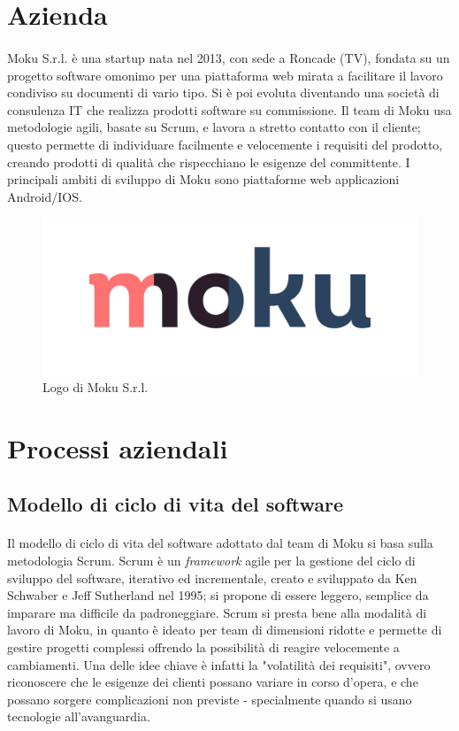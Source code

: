 \section{Azienda}
\paragraph{}
Moku S.r.l. è una startup nata nel 2013, con sede a Roncade (TV), fondata su un progetto software omonimo per una piattaforma web mirata a facilitare il lavoro condiviso su documenti di vario tipo. Si è poi evoluta diventando una società di consulenza IT che realizza prodotti software su commissione. 
Il team di Moku usa metodologie agili, basate su Scrum, e lavora a stretto contatto con il cliente; questo permette di individuare facilmente e velocemente i requisiti del prodotto, creando prodotti di qualità che rispecchiano le esigenze del committente. I principali ambiti di sviluppo di Moku sono piattaforme web applicazioni Android/IOS.

\begin{figure}[h!]
    \includegraphics[width=\textwidth]{figures/logo_moku.png}
    \caption[Logo Moku]{Logo di Moku S.r.l.
    \label{fig:logomoku}}
\end{figure}    

\section{Processi aziendali}
\subsection{Modello di ciclo di vita del software}
\paragraph{}
Il modello di ciclo di vita del software adottato dal team di Moku si basa sulla metodologia Scrum. Scrum è un \textit{framework} agile per la gestione del ciclo di sviluppo del software, iterativo ed incrementale, creato e sviluppato da Ken Schwaber e Jeff Sutherland nel 1995; si propone di essere leggero, semplice da imparare ma difficile da padroneggiare. Scrum si presta bene alla modalità di lavoro di Moku, in quanto è ideato per team di dimensioni ridotte e permette di gestire progetti complessi offrendo la possibilità di reagire velocemente a cambiamenti. Una delle idee chiave è infatti la "volatilità dei requisiti", ovvero riconoscere che le esigenze dei clienti possano variare in corso d'opera, e che possano sorgere complicazioni non previste - specialmente quando si usano tecnologie all'avanguardia.

